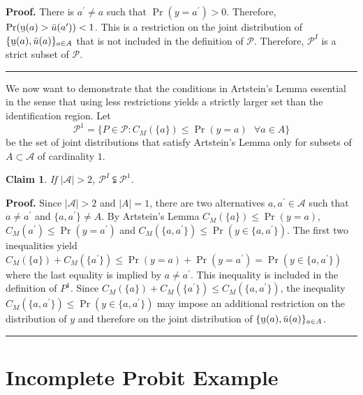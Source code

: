 \documentclass[reqno]{article}
\newtheorem{claim}{Claim}[section]
\newenvironment{proof}[1][Proof]{\textbf{#1.} }{\ \rule{0.5em}{0.5em}}
\begin{document}
\begin{proof}
There is $a^{ \prime } \neq a$ such that $\Pr (y =a^{ \prime }) >0$.
Therefore, $\Pr (\text{\b{u}}(a) >\bar{u} (a^{ \prime })) <1$. This is a restriction on the joint distribution of $\{\text{\b{u}} (a) ,\bar{u} (a)\}_{a \in A}$ that is not included in the definition of $\mathcal{P}$. Therefore, $\mathcal{P}^{I}$ is a strict subset of $\mathcal{P}$.
\end{proof}

We now want to demonstrate that the conditions in Artstein's Lemma essential in the sense that using less restrictions yields a strictly larger set than the identification region. Let 
\begin{equation*}
\mathcal{P}^{1}=\{P\in \mathcal{P} :C_{M}(\{a\})\leq \Pr (y=a) \text{ } \forall a\in A\}
\end{equation*}%
be the set of joint distributions that satisfy Artstein's Lemma only for subsets of $A \subset \mathcal{A}$ of cardinality $1$.

\begin{claim}
If $\vert \mathcal{A}\vert >2$, $\mathcal{P}^{I} \subsetneqq \mathcal{P}^1$.
\end{claim}

\begin{proof}
Since $\vert \mathcal{A}\vert >2$ and $\vert A \vert =1$, there are two alternatives $a ,a^{ \prime } \in \mathcal{A}$ such that $a \neq a^{ \prime }$ and $\{a ,a^{ \prime }\} \neq A$. By Artstein's Lemma $C_{M} (\{a\}) \leq \Pr (y =a)$, $C_{M} (a^{ \prime }) \leq \Pr (y =a^{ \prime })$ and $C_{M} (\{a ,a^{ \prime }\}) \leq \Pr (y \in \{a ,a^{ \prime }\})$. The first two inequalities yield $C_{M} (\{a\}) +C_{M} (\{a^{ \prime }\}) \leq \Pr (y =a) +\Pr (y =a^{ \prime }) =\Pr (y \in \{a ,a^{ \prime }\})$ where the last equality is implied by $a \neq a^{ \prime }$. This inequality is included in the definition of $P^{1}$. Since $C_{M} (\{a\}) +C_{M} (\{a^{ \prime }\}) \leq C_{M} (\{a ,a^{ \prime }\})$, the inequality $C_{M} (\{a ,a^{ \prime }\}) \leq \Pr (y \in \{a ,a^{ \prime }\})$ may impose an additional restriction on the distribution of $y$ and therefore on the joint distribution of $\{ \text{\b{u}} (a) ,\bar{u} (a)\}_{a \in A}$.
\end{proof}

\section{Incomplete Probit Example}
\end{document}
